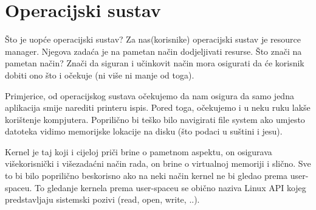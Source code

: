 

\section{Operacijski sustav}
Što je uopće operacijski sustav? Za nas(korisnike) operacijski sustav je
resource manager. Njegova zadaća je na pametan način dodjeljivati resurse.
Što znači na pametan način? Znači da siguran i učinkovit način mora osigurati
da će korisnik dobiti ono što i očekuje (ni više ni manje od toga).

Primjerice, od operacijskog sustava očekujemo da nam osigura da samo jedna
aplikacija smije narediti printeru ispis. Pored toga, očekujemo i u neku ruku
lakše korištenje kompjutera. Poprilično bi teško bilo navigirati file system
ako umjesto datoteka vidimo memorijske lokacije na disku (što podaci u suštini
i jesu).

Kernel je taj koji i cijeloj priči brine o pametnom aspektu, on osigurava
višekorisnički i višezadaćni način rada, on brine o virtualnoj memoriji i
slično. Sve to bi bilo poprilično beskorisno ako na neki način kernel ne bi
gledao prema user-spaceu. To gledanje kernela prema user-spaceu se obično
naziva Linux API kojeg predstavljaju sistemski pozivi (read, open, write, ..).




